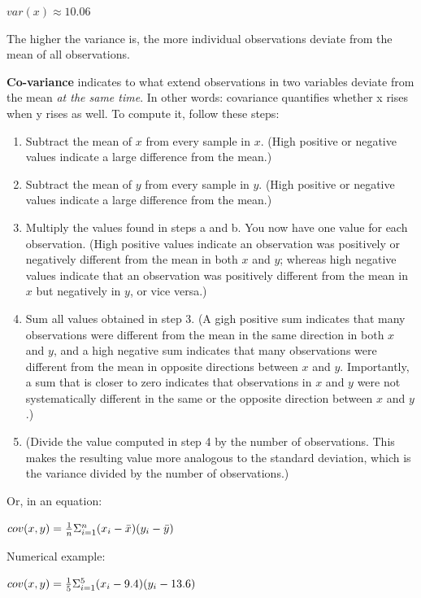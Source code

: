 \documentclass[11pt]{article}
\providecommand{\tightlist}{%
      \setlength{\itemsep}{0pt}\setlength{\parskip}{0pt}}
\begin{document}
\(var(x) \approx 10.06\)

The higher the variance is, the more individual observations deviate
from the mean of all observations.

\textbf{Co-variance} indicates to what extend observations in two
variables deviate from the mean \emph{at the same time}. In other words:
covariance quantifies whether x rises when y rises as well. To compute
it, follow these steps:

\begin{enumerate}
\def\labelenumi{\arabic{enumi}.}
\tightlist
\item
  Subtract the mean of \(x\) from every sample in \(x\). (High positive
  or negative values indicate a large difference from the mean.)
\item
  Subtract the mean of \(y\) from every sample in \(y\). (High positive
  or negative values indicate a large difference from the mean.)
\item
  Multiply the values found in steps a and b. You now have one value for
  each observation. (High positive values indicate an observation was
  positively or negatively different from the mean in both \(x\) and
  \(y\); whereas high negative values indicate that an observation was
  positively different from the mean in \(x\) but negatively in \(y\),
  or vice versa.)
\item
  Sum all values obtained in step 3. (A gigh positive sum indicates that
  many observations were different from the mean in the same direction
  in both \(x\) and \(y\), and a high negative sum indicates that many
  observations were different from the mean in opposite directions
  between \(x\) and \(y\). Importantly, a sum that is closer to zero
  indicates that observations in \(x\) and \(y\) were not systematically
  different in the same or the opposite direction between \(x\) and
  \(y\).)
\item
  (Divide the value computed in step 4 by the number of observations.
  This makes the resulting value more analogous to the standard
  deviation, which is the variance divided by the number of
  observations.)
\end{enumerate}

Or, in an equation:

\(cov(x,y) = {{1} \over {n}} \Sigma^{n}_{i=1} (x_{i} - \bar{x}) (y_{i} - \bar{y})\)

Numerical example:

\(cov(x,y) = {{1} \over {5}} \Sigma^{5}_{i=1} (x_{i} - 9.4) (y_{i} - 13.6)\)
\end{document}
